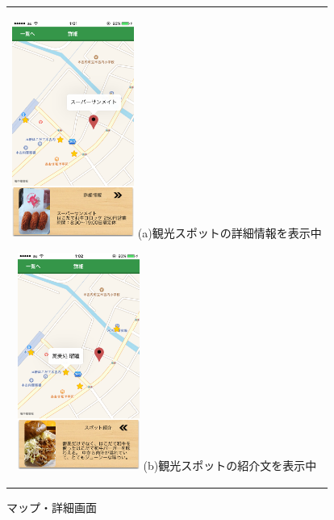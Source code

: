 \begin{figure}[htbp]
  \begin{center}
    \begin{tabular}{c}

      \begin{minipage}{0.33\hsize}
        \begin{center}
\includegraphics[width=4cm, bb=0 0 705 1334]{kiko_map1.png}
         \hspace{1cm} %
          {\footnotesize (a)観光スポットの詳細情報を表示中}
        \end{center}
      \end{minipage}

      \begin{minipage}{0.33\hsize}
        \begin{center}
\includegraphics[width=4cm, bb=0 0 705 1334]{kiko_map2.png}
          \hspace{1cm} %
          {\footnotesize (b)観光スポットの紹介文を表示中}
        \end{center}
      \end{minipage}

    \end{tabular}
    \caption{マップ・詳細画面}
    \label{fig:lena}
  \end{center}
\end{figure}
\
